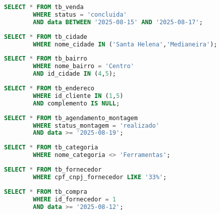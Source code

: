\documentclass[
12pt,
a4paper,
semrecuonosumario,
sumario = abnt-6027-2012]{report}
\begin{document}
    \begin{lstlisting}[language=SQL,caption={SELECT -- Tabela \texttt{tb\_venda}}]
        SELECT * FROM tb_venda
        WHERE status = 'concluida'
        AND data BETWEEN '2025-08-15' AND '2025-08-17';
    \end{lstlisting}
    
    \begin{lstlisting}[language=SQL,caption={SELECT -- Tabela \texttt{tb\_cidade}}]
        SELECT * FROM tb_cidade
        WHERE nome_cidade IN ('Santa Helena','Medianeira');
    \end{lstlisting}
    
    \begin{lstlisting}[language=SQL,caption={SELECT -- Tabela \texttt{tb\_bairro}}]
        SELECT * FROM tb_bairro
        WHERE nome_bairro = 'Centro'
        AND id_cidade IN (4,5);
    \end{lstlisting}
    
    \begin{lstlisting}[language=SQL,caption={SELECT -- Tabela \texttt{tb\_endereco}}]
        SELECT * FROM tb_endereco
        WHERE id_cliente IN (1,5)
        AND complemento IS NULL;
    \end{lstlisting}
    
    \begin{lstlisting}[language=SQL,caption={SELECT -- Tabela \texttt{tb\_agendamento\_montagem}}]
        SELECT * FROM tb_agendamento_montagem
        WHERE status_montagem = 'realizado'
        AND data >= '2025-08-19';
    \end{lstlisting}
    
    \begin{lstlisting}[language=SQL,caption={SELECT -- Tabela \texttt{tb\_categoria}}]
        SELECT * FROM tb_categoria
        WHERE nome_categoria <> 'Ferramentas';
    \end{lstlisting}
    
    \begin{lstlisting}[language=SQL,caption={SELECT -- Tabela \texttt{tb\_fornecedor}}]
        SELECT * FROM tb_fornecedor
        WHERE cpf_cnpj_fornecedor LIKE '33%';
    \end{lstlisting}
    
    \begin{lstlisting}[language=SQL,caption={SELECT -- Tabela \texttt{tb\_compra}}]
        SELECT * FROM tb_compra
        WHERE id_fornecedor = 1
        AND data >= '2025-08-12';
    \end{lstlisting}
    
\end{document}
